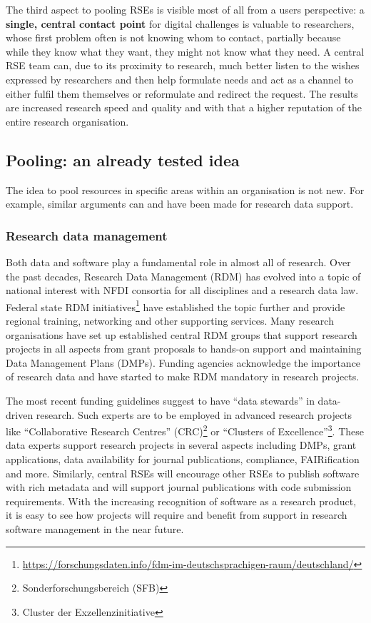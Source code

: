 \documentclass[a4paper]{article}
\begin{document}
The third aspect to pooling RSEs is visible most of all from a users perspective: a \textbf{single, central contact point} for digital challenges is valuable to researchers, whose first problem often is not knowing whom to contact, partially because while they know what they want, they might not know what they need.
A central RSE team can, due to its proximity to research, much better listen to the wishes expressed by researchers and then help formulate needs and act as a channel to either fulfil them themselves or reformulate and redirect the request.
The results are increased research speed and quality and with that a higher reputation of the entire research organisation.

\subsection{Pooling: an already tested idea}
The idea to pool resources in specific areas within an organisation is not new.
For example, similar arguments can and have been made for research data support.

\subsubsection{Research data management}
Both data and software play a fundamental role in almost all of research.
Over the past decades, Research Data Management (RDM) has evolved into a topic of national interest with NFDI consortia for all disciplines and a research data law.
Federal state RDM initiatives\footnote{\url{https://forschungsdaten.info/fdm-im-deutschsprachigen-raum/deutschland/}} have established the topic further and provide regional training, networking and other supporting services.
Many research organisations have set up established central RDM groups that support research projects in all aspects from grant proposals to hands-on support and maintaining Data Management Plans (DMPs).
Funding agencies acknowledge the importance of research data and have started to make RDM mandatory in research projects.

The most recent funding guidelines suggest to have “data stewards” in data-driven research.
Such experts are to be employed in advanced research projects like “Collaborative Research Centres” (CRC)\footnote{Sonderforschungsbereich (SFB)} or “Clusters of Excellence”\footnote{Cluster der Exzellenzinitiative}.
These data experts support research projects in several aspects including DMPs, grant applications, data availability for journal publications, compliance, FAIRification and more.
Similarly, central RSEs will encourage other RSEs to publish software with rich metadata and will support journal publications with code submission requirements.
With the increasing recognition of software as a research product, it is easy to see how projects will require and benefit from support in research software management in the near future.
\end{document}
